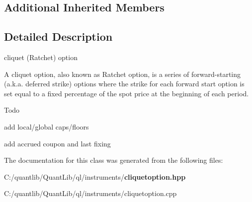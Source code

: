 \subsection*{Additional Inherited Members}


\subsection{Detailed Description}
cliquet (Ratchet) option 

A cliquet option, also known as Ratchet option, is a series of forward-\/starting (a.\+k.\+a. deferred strike) options where the strike for each forward start option is set equal to a fixed percentage of the spot price at the beginning of each period.

\begin{DoxyRefDesc}{Todo}
\item[{\bf Todo}]
\begin{DoxyItemize}
\item add local/global caps/floors
\item add accrued coupon and last fixing
\end{DoxyItemize}\end{DoxyRefDesc}


The documentation for this class was generated from the following files\+:\begin{DoxyCompactItemize}
\item 
C\+:/quantlib/\+Quant\+Lib/ql/instruments/{\bf cliquetoption.\+hpp}\item 
C\+:/quantlib/\+Quant\+Lib/ql/instruments/cliquetoption.\+cpp\end{DoxyCompactItemize}
